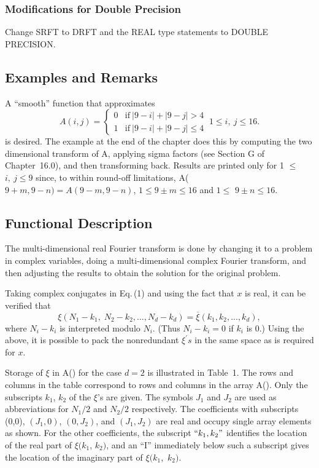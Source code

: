 \documentclass[twoside]{MATH77}
\begin{document}
\subsubsection{Modifications for Double Precision}

Change SRFT to DRFT and the REAL type statements to DOUBLE PRECISION.

\subsection{Examples and Remarks}

A ``smooth'' function that approximates%
\begin{equation*}
A(i,j)=
\begin{cases}
0 & \text{if}\ |9-i|+|9-j|>4 \\
1 & \text{if}\ |9-i|+|9-j|\leq 4
\end{cases}
\ 1\leq i,\ j\leq 16.
\end{equation*}
is desired. The example at the end of the chapter does this by computing
the two dimensional transform of A, applying sigma factors (see Section
G of Chapter~16.0), and then transforming back. Results are printed only
for 1 $\leq $ $i,\ j\leq 9$ since, to within round-off limitations, A($%
9+m,9-n)={\textstyle A}(9-m,9-n)$, $1\leq 9\pm m\leq 16$ and $1\leq $ $9\pm
n\leq 16.$

\subsection{Functional Description}

The multi-dimensional real Fourier transform is done by changing it to a
problem in complex variables, doing a multi-dimensional complex Fourier
transform, and then adjusting the results to obtain the solution for the
original problem.

Taking complex conjugates in Eq.\,(1) and using the fact that $x$ is real, it
can be verified that%
\begin{equation*}
\xi (N_1-k_1,\;N_2-k_2,...,N_d-k_d)=\overline{\xi }(k_1,k_2,...,k_d),
\end{equation*}
where $N_i-k_i$ is interpreted modulo $N_i$. (Thus $N_i-k_i=0$ if $k_i$ is
0.) Using the above, it is possible to pack the nonredundant $\xi ^{\prime
}s $ in the same space as is required for $x$.

Storage of $\xi $ in A() for the case $d=2$ is illustrated in Table~1. The
rows and columns in the table correspond to rows and columns in the array
A(). Only the subscripts $k_1$, $k_2$ of the $\xi $'s are given.
The symbols $J_1$ and $J_2$ are used as abbreviations for $N_1/2$ and $N_2/2$
respectively. The coefficients with subscripts (0,0), $(J_1,0)$, $(0,J_2)$,
and $(J_1,J_2)$ are real and occupy single array elements as shown. For the
other coefficients, the subscript $``k_1,k_2"$ identifies the location of
the real part of $\xi (k_1$, $k_2)$, and an ``I'' immediately below such a
subscript gives the location of the imaginary part of $\xi (k_1$,\ $k_2).$
\end{document}
